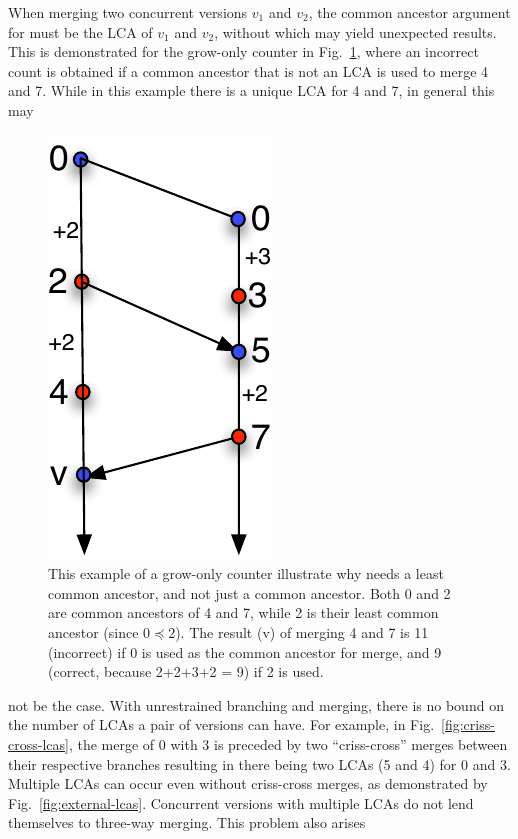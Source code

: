 When merging two concurrent versions $v_1$ and $v_2$, the common
ancestor argument for  must be the LCA of $v_1$ and $v_2$,
without which  may yield unexpected results. This is
demonstrated for the grow-only counter in
Fig.~\ref{fig:merge-needs-lca}, where an incorrect count is obtained if a
common ancestor that is not an LCA is used to merge 4 and 7. While in
this example there is a unique LCA for 4 and 7, in general this may
\begin{figure}
\centering
\includegraphics[scale=0.6]{Figures/merge-needs-lca}
\caption{This example of a grow-only counter illustrate why 
needs a least common ancestor, and not just a common ancestor. Both 0
and 2 are common ancestors of 4 and 7, while 2 is their least common
ancestor (since $0 \preceq 2$). The result (v) of merging 4 and 7 is
11 (incorrect) if 0 is used as the common ancestor for merge, and 9
(correct, because 2+2+3+2 = 9) if 2 is used. }
\label{fig:merge-needs-lca}
\end{figure}
not be the case. With unrestrained branching and merging, there is no
bound on the number of LCAs a pair of versions can have.  For example,
in Fig.~\ref{fig:criss-cross-lcas}, the merge of 0 with 3 is preceded
by two ``criss-cross'' merges between their respective branches
resulting in there being two LCAs (5 and 4) for 0 and 3. Multiple LCAs
can occur even without criss-cross merges, as demonstrated by
Fig.~\ref{fig:external-lcas}. Concurrent versions with multiple LCAs
do not lend themselves to three-way merging. This problem also arises
